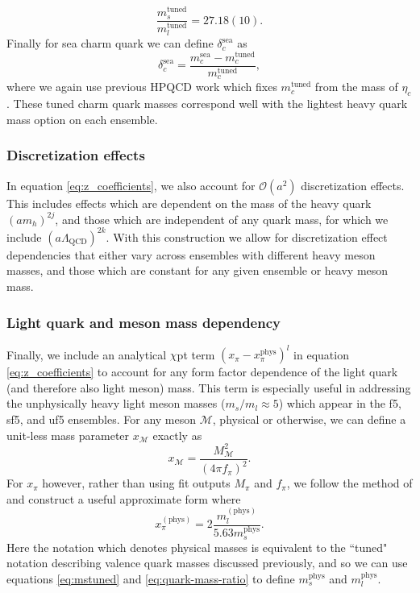 \begin{equation}\label{eq:quark-mass-ratio}
    \frac{m_s^{\mathrm{tuned}}}{m_l^{\mathrm{tuned}}} = 27.18(10).
\end{equation}
Finally for sea charm quark we can define $\delta^{\mathrm{sea}}_c$ as 
\begin{equation}\label{eq:delta_c}
\delta^{\mathrm{sea}}_c=\frac{m_c^{\mathrm{sea}}-m_c^{\mathrm{tuned}}}{m_c^{\mathrm{tuned}}},
\end{equation}
where we again use previous HPQCD work which fixes $m_c^{\mathrm{tuned}}$ from the mass of $\eta_c$ \cite{PhysRevD.102.054511}.  These tuned charm quark masses correspond well with the lightest heavy quark mass option on each ensemble.

\subsubsection{Discretization effects}
In equation \ref{eq:z_coefficients}, we also account for $\mathcal{O}(a^2)$ discretization effects.  This includes effects which are dependent on the mass of the heavy quark $(am_h)^{2j}$, and those which are independent of any quark mass, for which we include $(a\Lambda_\mathrm{QCD})^{2k}$.  With this construction we allow for discretization effect dependencies that either vary across ensembles with different heavy meson masses, and those which are constant for any given ensemble or heavy meson mass.

\subsubsection{Light quark and meson mass dependency}
Finally, we include an analytical $\chi$pt term $(x_{\pi}-x_{\pi}^{\mathrm{phys}})^{l}$ in equation \ref{eq:z_coefficients} to account for any form factor dependence of the light quark (and therefore also light meson) mass. This term is especially useful in addressing the unphysically heavy light meson masses ($m_s/m_l \approx 5$) which appear in the f5, sf5, and uf5 ensembles. For any meson $\mathcal{M}$, physical or otherwise, we can define a unit-less mass parameter $x_\mathcal{M}$ exactly as 
\begin{equation}\label{eq:x_pi}
    {x_{\mathcal{M}}}=\frac{M^2_{\mathcal{M}}}{(4\pi f_\pi)^2}.
\end{equation}
For $x_\pi$ however, rather than using fit outputs $M_\pi$ and $f_\pi$, we follow the method of \cite{Will_technical} and construct a useful approximate form where
\begin{equation}\label{eq:approx_x_pi}
    x_\pi^{(\mathrm{phys})} = 2\frac{m_l^{(\mathrm{phys})}}{5.63m_s^{\mathrm{phys}}}.
\end{equation}
Here the notation which denotes physical masses is equivalent to the ``tuned" notation describing valence quark masses discussed previously, and so we can use equations \ref{eq:mstuned} and \ref{eq:quark-mass-ratio} to define $m_s^{\mathrm{phys}}$ and $m_l^{\mathrm{phys}}$.  


